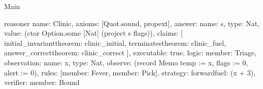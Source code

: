\begin{lexlean}{Main}
\begin{semanticmodule}
reasoner{
  name: Clinic,
  axioms: [Quot.sound, propext],
  answer: {name: s, type: Nat, value: (ctor Option.some [Nat] (project s flags))},
  claims: [
    initial_invariant{theorem: clinic_initial},
    terminates{theorem: clinic_fuel},
    answer_correct{theorem: clinic_correct}
  ],
  executable: true,
  logic: {member: Triage},
  observation: {name: x, type: Nat},
  observe: (record Memo {temp := x, flags := 0, alert := 0}),
  rules: [{member: Fever}, {member: Pick}],
  strategy: forward{fuel: (x + 3)},
  verifier: {member: Bound}
}
\end{semanticmodule}
\end{lexlean}
